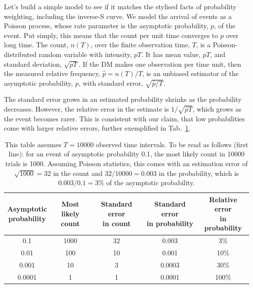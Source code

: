 \documentclass[a4paper, 12pt]{article}
\newcommand{\tlabel}[1]{\label{tab:#1}}
\newcommand{\tref}[1]{Tab.~\ref{tab:#1}}
\begin{document}
Let's build a simple model to see if it matches the stylised facts of probability weighting, including the inverse-S curve. We model the arrival of events as a Poisson process, whose rate parameter is the asymptotic probability, $p$, of the event. Put simply, this means that the count per unit time converges to $p$ over long time. The count, $n(T)$, over the finite observation time, $T$, is a Poisson-distributed random variable with intensity, $pT$. It has mean value, $pT$, and standard deviation, $\sqrt{pT}$. If the DM makes one observation per time unit, then the measured relative frequency, $\hat{p} = n(T)/T$, is an unbiased estimator of the asymptotic probability, $p$, with standard error, $\sqrt{\hat{p}/T}$.

The standard error grows in an estimated probability shrinks as the probability decreases. However, the relative error in the estimate is $1/\sqrt{\hat{p}T}$, which grows as the event becomes rarer. This is consistent with our claim, that low probabilities come with larger relative errors, further exemplified in \tref{errors}. 

\begin{table}[!htb]
\centering
\begin{tabular}{@{}ccccc@{}}
\toprule[2pt]
\makecell{Asymptotic\\probability} & \makecell{Most likely\\count} & \makecell{Standard error\\in count} & \makecell{Standard error\\in probability} & \makecell{Relative error\\in probability}\\
\midrule[2pt]
0.1 & 1000 & 32 & 0.003 & 3\%\\
0.01 & 100 & 10 & 0.001 & 10\%\\
0.001 & 10 & 3 & 0.0003& 30\%\\
0.0001 & 1 & 1 & 0.0001 &100\%\\
\bottomrule[2pt]
\end{tabular}
\caption{This table assumes $T = 10000$ observed time intervals. To be read as follows (first line): for an event of asymptotic probability 0.1, the most likely count in 10000 trials is 1000. Assuming Poisson statistics, this comes with an estimation error of $\sqrt{1000} = 32$ in the count and $32/10000 = 0.003$ in the probability, which is $0.003/0.1=3\%$ of the asymptotic probability.}\tlabel{errors}
\end{table}
\end{document}
